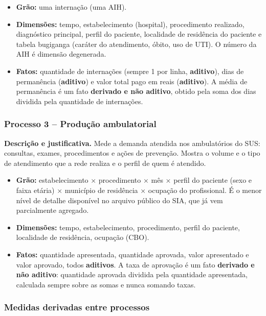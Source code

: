 \documentclass[12pt,a4paper]{article}
\begin{document}
\begin{itemize}\item \textbf{Grão:} uma internação (uma AIH).
\item \textbf{Dimensões:} tempo, estabelecimento (hospital), procedimento realizado, diagnóstico principal, perfil do paciente, localidade de residência do paciente e tabela bugiganga (caráter do atendimento, óbito, uso de UTI). O número da AIH é dimensão degenerada.
\item \textbf{Fatos:} quantidade de internações (sempre 1 por linha, \textbf{aditivo}), dias de permanência (\textbf{aditivo}) e valor total pago em reais (\textbf{aditivo}). A média de permanência é um fato \textbf{derivado e não aditivo}, obtido pela soma dos dias dividida pela quantidade de internações.\end{itemize}

\subsubsection*{Processo 3 – Produção ambulatorial}

\textbf{Descrição e justificativa.} Mede a demanda atendida nos ambulatórios do SUS: consultas, exames, procedimentos e ações de prevenção. Mostra o volume e o tipo de atendimento que a rede realiza e o perfil de quem é atendido.


\begin{itemize}\item \textbf{Grão:} estabelecimento × procedimento × mês × perfil do paciente (sexo e faixa etária) × município de residência × ocupação do profissional. É o menor nível de detalhe disponível no arquivo público do SIA, que já vem parcialmente agregado.
\item \textbf{Dimensões:} tempo, estabelecimento, procedimento, perfil do paciente, localidade de residência, ocupação (CBO).
\item \textbf{Fatos:} quantidade apresentada, quantidade aprovada, valor apresentado e valor aprovado, todos \textbf{aditivos}. A taxa de aprovação é um fato \textbf{derivado e não aditivo}: quantidade aprovada dividida pela quantidade apresentada, calculada sempre sobre as somas e nunca somando taxas.\end{itemize}

\subsubsection*{Medidas derivadas entre processos}
\end{document}
